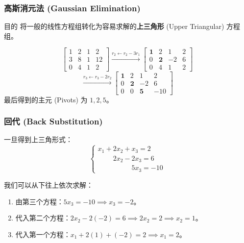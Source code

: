 \begin{frame}
\frametitle{高斯消元法 (Gaussian Elimination)}

\begin{block}{目的}
将一般的线性方程组转化为容易求解的\textbf{上三角形} (Upper Triangular) 方程组。
\end{block}

\begin{eg}[消元步骤]
\[
\left[ \begin{array}{ccc|c}
1 & 2 & 1 & 2 \\
3 & 8 & 1 & 12 \\
0 & 4 & 1 & 2
\end{array} \right]
\xrightarrow{r_2 \leftarrow r_2 - 3r_1}
\left[ \begin{array}{ccc|c}
\mathbf{1} & 2 & 1 & 2 \\
0 & \mathbf{2} & -2 & 6 \\
0 & 4 & 1 & 2
\end{array} \right]
\]
\[
\xrightarrow{r_3 \leftarrow r_3 - 2r_2}
\left[ \begin{array}{ccc|c}
\mathbf{1} & 2 & 1 & 2 \\
0 & \mathbf{2} & -2 & 6 \\
0 & 0 & \mathbf{5} & -10
\end{array} \right]
\]
最后得到的主元 (Pivots) 为 $1, 2, 5$。
\end{eg}

\end{frame}


\begin{frame}
\frametitle{回代 (Back Substitution)}

一旦得到上三角形式：
\[
\begin{cases}
x_1 + 2x_2 + x_3 = 2 \\
\phantom{x_1 + } 2x_2 - 2x_3 = 6 \\
\phantom{x_1 + 2x_2 + } 5x_3 = -10
\end{cases}
\]

\pause

我们可以从下往上依次求解：
\begin{enumerate}
    \item 由第三个方程：$5x_3 = -10 \implies x_3 = -2$。
    \item 代入第二个方程：$2x_2 - 2(-2) = 6 \implies 2x_2 = 2 \implies x_2 = 1$。
    \item 代入第一个方程：$x_1 + 2(1) + (-2) = 2 \implies x_1 = 2$。
\end{enumerate}

\end{frame}

